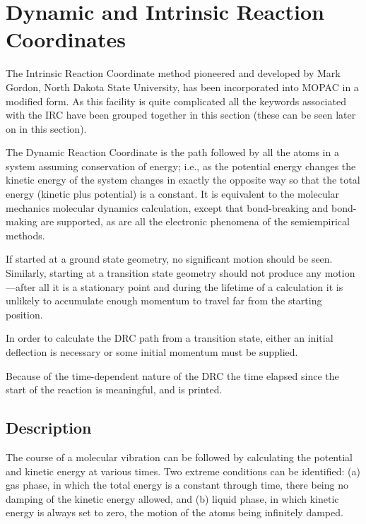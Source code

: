 \section{Dynamic and Intrinsic Reaction Coordinates}
\label{t_irc}
The Intrinsic Reaction Coordinate method pioneered and developed by Mark
Gordon, North Dakota State University,   has
been incorporated into MOPAC in a modified form.  As this facility is quite
complicated all the keywords associated with  the IRC have been grouped
together in this section (these can be seen later on  in this section).
 

The Dynamic Reaction Coordinate is the path  followed  by  all  the atoms  in
a  system  assuming  conservation  of  energy;  i.e.,  as the potential energy
changes the kinetic energy of  the  system  changes  in exactly  the  opposite
way  so  that  the  total  energy  (kinetic plus potential) is a constant.  It
is equivalent to the molecular mechanics molecular dynamics calculation, except
that bond-breaking and bond-making are supported, as are all the electronic
phenomena of the semiempirical methods.

If started at a  ground  state  geometry,  no  significant  motion should be seen.  Similarly, starting at a transition
state geometry should not produce  any  motion---after  all  it  is  a
stationary point and during the lifetime of a calculation it is unlikely to
accumulate enough momentum to travel far from the starting position.

In order to calculate the DRC path from a transition state,  either an
initial  deflection  is  necessary  or some initial momentum must be supplied.

Because of the time-dependent nature of the DRC  the  time  elapsed since the
start of the reaction is meaningful, and is printed.

\subsection*{Description}
The course of a molecular vibration can be followed by  calculating the
potential  and  kinetic  energy  at  various  times.   Two  extreme conditions
can be identified:  (a) gas phase, in which the total  energy is a constant
through time, there being no damping of the kinetic energy allowed, and (b)
liquid phase, in which kinetic energy is always set  to zero, the motion of the
atoms being infinitely damped.

